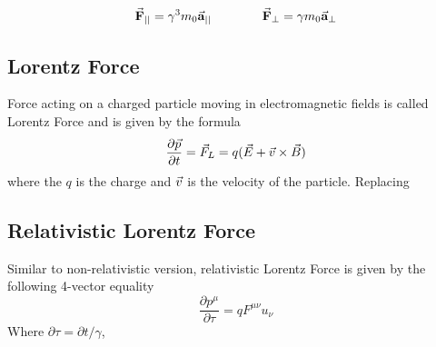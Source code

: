 \documentclass{article}
\begin{document}
\begin{equation} \label{eq:Frel_para_and_perp}
    \begin{aligned}
        \vec{\textbf{F}}_{||} = \gamma^3  m_0 \vec{\textbf{a}}_{||}
    \end{aligned}
    \qquad \qquad
    \begin{aligned}
        \vec{\textbf{F}}_{\perp} = \gamma  m_0\vec{\textbf{a}}_{\perp}
    \end{aligned}
\end{equation}

\subsection{Lorentz Force}
Force acting on a charged particle moving in electromagnetic fields is called Lorentz Force and is given by the formula
\newline
\begin{equation} \label{eq:lf}
    \frac{\partial \vec{p}}{\partial t} = \vec{F}_L=q(\vec{E}+ \vec{v} \times \vec{B})
\end{equation}
\newline
where the $q$ is the charge and $\vec{v}$ is the velocity of the particle. Replacing 

\subsection{Relativistic Lorentz Force}
Similar to non-relativistic version, relativistic Lorentz Force is given by the following 4-vector equality
\newline
\begin{equation}
    \frac{\partial p^{\mu}}{\partial \tau} = q F^{\mu \nu} u_{\nu}
\end{equation}
\newline
Where $ \partial \tau = \partial t / \gamma $,
\end{document}
